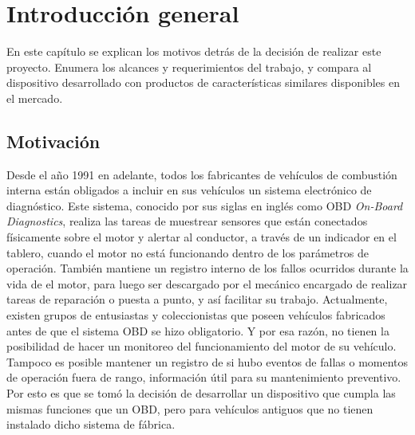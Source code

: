 \chapter{Introducción general} %

En este capítulo se explican los motivos detrás de la decisión de realizar este proyecto. 
Enumera los alcances y requerimientos del trabajo, y compara al dispositivo desarrollado con productos de características similares disponibles en el mercado.

\label{Chapter1} %
\label{IntroGeneral}


\newcommand{\keyword}[1]{\textbf{#1}}
\newcommand{\tabhead}[1]{\textbf{#1}}
\newcommand{\code}[1]{\texttt{#1}}
\newcommand{\file}[1]{\texttt{\bfseries#1}}
\newcommand{\option}[1]{\texttt{\itshape#1}}
\newcommand{\grados}{$^{\circ}$}



\section{Motivación}

Desde el año 1991 en adelante, todos los fabricantes de vehículos de combustión interna están obligados a incluir en sus vehículos un sistema electrónico de diagnóstico. Este sistema, conocido por sus siglas en inglés como OBD \textit{On-Board Diagnostics}, realiza las tareas de muestrear sensores que están conectados físicamente sobre el motor y alertar al conductor, a través de un indicador en el tablero, cuando el motor no está funcionando dentro de los parámetros de operación. También mantiene un registro interno de los fallos ocurridos durante la vida de el motor, para luego ser descargado por el mecánico encargado de realizar tareas de reparación o puesta a punto, y así facilitar su trabajo.
Actualmente, existen grupos de entusiastas y coleccionistas que poseen vehículos fabricados antes de que el sistema OBD se hizo obligatorio. Y por esa razón, no tienen la posibilidad de hacer un monitoreo del funcionamiento del motor de su vehículo. Tampoco es posible mantener un registro de si hubo eventos de fallas o momentos de operación fuera de rango, información útil para su mantenimiento preventivo.
Por esto es que se tomó la decisión de desarrollar un dispositivo que cumpla las mismas funciones que un OBD, pero para vehículos antiguos que no tienen instalado dicho sistema de fábrica.

